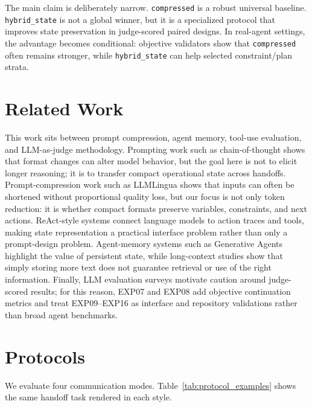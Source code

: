 \documentclass[11pt]{article}
\begin{document}
The main claim is deliberately narrow. \texttt{compressed} is a robust universal baseline. \texttt{hybrid\_state} is not a global winner, but it is a specialized protocol that improves state preservation in judge-scored paired designs. In real-agent settings, the advantage becomes conditional: objective validators show that \texttt{compressed} often remains stronger, while \texttt{hybrid\_state} can help selected constraint/plan strata.

\section{Related Work}
This work sits between prompt compression, agent memory, tool-use evaluation, and LLM-as-judge methodology. Prompting work such as chain-of-thought shows that format changes can alter model behavior, but the goal here is not to elicit longer reasoning; it is to transfer compact operational state across handoffs. Prompt-compression work such as LLMLingua shows that inputs can often be shortened without proportional quality loss, but our focus is not only token reduction: it is whether compact formats preserve variables, constraints, and next actions. ReAct-style systems connect language models to action traces and tools, making state representation a practical interface problem rather than only a prompt-design problem. Agent-memory systems such as Generative Agents highlight the value of persistent state, while long-context studies show that simply storing more text does not guarantee retrieval or use of the right information. Finally, LLM evaluation surveys motivate caution around judge-scored results; for this reason, EXP07 and EXP08 add objective continuation metrics and treat EXP09--EXP16 as interface and repository validations rather than broad agent benchmarks.

\section{Protocols}
We evaluate four communication modes. Table~\ref{tab:protocol_examples} shows the same handoff task rendered in each style.
\end{document}
